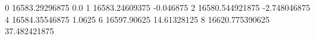 0 16583.29296875 0.0
1 16583.24609375 -0.046875
2 16580.544921875 -2.748046875
4 16584.35546875 1.0625
6 16597.90625 14.61328125
8 16620.775390625 37.482421875
